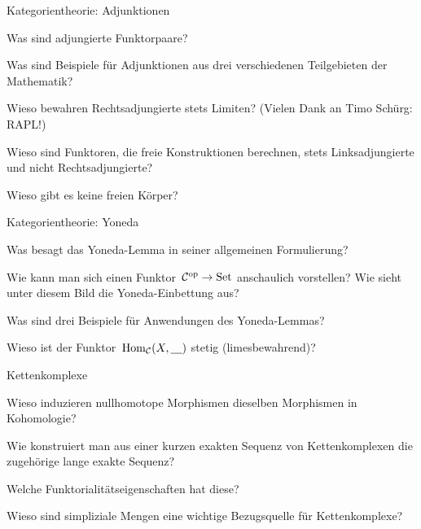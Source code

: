 \documentclass{uebblatt}
\begin{document}
\begin{aufgabeE}{Kategorientheorie: Adjunktionen}
\item Was sind adjungierte Funktorpaare?
\item Was sind Beispiele für Adjunktionen aus drei verschiedenen Teilgebieten
der Mathematik?
\item Wieso bewahren Rechtsadjungierte stets Limiten? (Vielen Dank an Timo
Schürg: RAPL!)
\item Wieso sind Funktoren, die freie Konstruktionen berechnen, stets
Linksadjungierte und nicht Rechtsadjungierte?
\item Wieso gibt es keine freien Körper?
\end{aufgabeE}

\begin{aufgabeE}{Kategorientheorie: Yoneda}
\item Was besagt das Yoneda-Lemma in seiner allgemeinen Formulierung?
\item Wie kann man sich einen Funktor~$\mathcal{C}^{\mathrm{op}} \to \mathrm{Set}$ anschaulich vorstellen?
Wie sieht unter diesem Bild die Yoneda-Einbettung aus?
\item Was sind drei Beispiele für Anwendungen des Yoneda-Lemmas?
\item Wieso ist der Funktor~$\mathrm{Hom}_{\mathcal{C}}(X,\underline{\quad})$ stetig (limesbewahrend)?
\end{aufgabeE}

\begin{aufgabeE}{Kettenkomplexe}
\item Wieso induzieren nullhomotope Morphismen dieselben Morphismen in
Kohomologie?
\item Wie konstruiert man aus einer kurzen exakten Sequenz von Kettenkomplexen
die zugehörige lange exakte Sequenz?
\item Welche Funktorialitätseigenschaften hat diese?
\item Wieso sind simpliziale Mengen eine wichtige Bezugsquelle für
Kettenkomplexe?
\end{aufgabeE}
\end{document}
